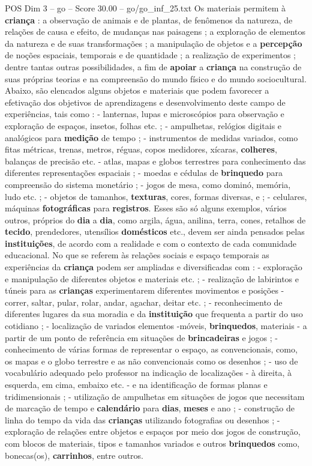 \begin{textsample}{POS Dim 3 – go – Score 30.00 – go/go\_inf\_25.txt}
Os materiais permitem à \textbf{criança} : a observação de animais e de plantas, de fenômenos da natureza, de relações de causa e efeito, de mudanças nas paisagens ; a exploração de elementos da natureza e de suas transformações ; a manipulação de objetos e a \textbf{percepção} de noções espaciais, temporais e de quantidade ; a realização de experimentos ; dentre tantas outras possibilidades, a fim de \textbf{apoiar} a \textbf{criança} na construção de suas próprias teorias e na compreensão do mundo físico e do mundo sociocultural.
Abaixo, são elencados alguns objetos e materiais que podem favorecer a efetivação dos objetivos de aprendizagens e desenvolvimento deste campo de experiências, tais como : - lanternas, lupas e microscópios para observação e exploração de espaços, insetos, folhas etc. ; - ampulhetas, relógios digitais e analógicos para \textbf{medição} de tempo ; - instrumentos de medidas variados, como fitas métricas, trenas, metros, réguas, copos medidores, xícaras, \textbf{colheres}, balanças de precisão etc. - atlas, mapas e globos terrestres para conhecimento das diferentes representações espaciais ; - moedas e cédulas de \textbf{brinquedo} para compreensão do sistema monetário ; - jogos de mesa, como dominó, memória, ludo etc. ; - objetos de tamanhos, \textbf{texturas}, cores, formas diversas, e ; - celulares, máquinas \textbf{fotográficas} para \textbf{registros}.
Esses são só alguns exemplos, vários outros, próprios do \textbf{dia} a \textbf{dia}, como argila, água, anilina, terra, cones, retalhos de \textbf{tecido}, prendedores, utensílios \textbf{domésticos} etc., devem ser ainda pensados pelas \textbf{instituições}, de acordo com a realidade e com o contexto de cada comunidade educacional.
No que se referem às relações sociais e espaço temporais as experiências da \textbf{criança} podem ser ampliadas e diversificadas com : - exploração e manipulação de diferentes objetos e materiais etc. ; - realização de labirintos e túneis para as \textbf{crianças} experimentarem diferentes movimentos e posições - correr, saltar, pular, rolar, andar, agachar, deitar etc. ; - reconhecimento de diferentes lugares da sua moradia e da \textbf{instituição} que frequenta a partir do uso cotidiano ; - localização de variados elementos -móveis, \textbf{brinquedos}, materiais - a partir de um ponto de referência em situações de \textbf{brincadeiras} e jogos ; - conhecimento de várias formas de representar o espaço, as convencionais, como, os mapas e o globo terrestre e as não convencionais como os desenhos ; - uso de vocabulário adequado pelo professor na indicação de localizações - à direita, à esquerda, em cima, embaixo etc. - e na identificação de formas planas e tridimensionais ; - utilização de ampulhetas em situações de jogos que necessitam de marcação de tempo e \textbf{calendário} para \textbf{dias}, \textbf{meses} e ano ; - construção de linha do tempo da vida das \textbf{crianças} utilizando fotografias ou desenhos ; - exploração de relações entre objetos e espaços por meio dos jogos de construção, com blocos de materiais, tipos e tamanhos variados e outros \textbf{brinquedos} como, bonecas(os), \textbf{carrinhos}, entre outros.

\end{textsample}
